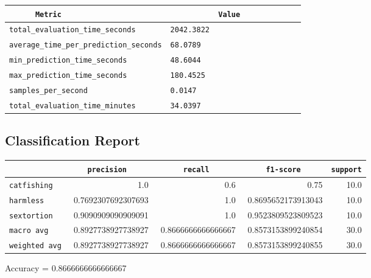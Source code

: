 \documentclass{article}
\begin{document}
\begin{center}
\begin{tabular}{l | l} \hline
    \verb|      Metric     | & \verb|           Value           | \\ \hline
    \hline
    \verb|total_evaluation_time_seconds| & \verb|2042.3822                    | \\ \hline
    \verb|average_time_per_prediction_seconds| & \verb|68.0789                      | \\ \hline
    \verb|min_prediction_time_seconds| & \verb|48.6044                      | \\ \hline
    \verb|max_prediction_time_seconds| & \verb|180.4525                     | \\ \hline
    \verb|samples_per_second| & \verb|0.0147                       | \\ \hline
    \verb|total_evaluation_time_minutes| & \verb|34.0397                      | \\ \hline
\end{tabular}
\end{center}

\subsection{Classification Report}

\begin{center}
\begin{tabular}{l | r | r | r | r} \hline
    \verb|            | & \verb|    precision     | & \verb|      recall      | & \verb|     f1-score     | & \verb|support| \\ \hline
    \hline
    \verb|catfishing | & 1.0 & 0.6 & 0.75 &    10.0 \\ \hline
    \verb|harmless   | & 0.7692307692307693 & 1.0 & 0.8695652173913043 &    10.0 \\ \hline
    \verb|sextortion | & 0.9090909090909091 & 1.0 & 0.9523809523809523 &    10.0 \\ \hline
    \verb|macro avg  | & 0.8927738927738927 & 0.8666666666666667 & 0.8573153899240854 &    30.0 \\ \hline
    \verb|weighted avg| & 0.8927738927738927 & 0.8666666666666667 & 0.8573153899240855 &    30.0 \\ \hline
\end{tabular}
\end{center}

\begin{center}
Accuracy = 0.8666666666666667
\end{center}
\end{document}
